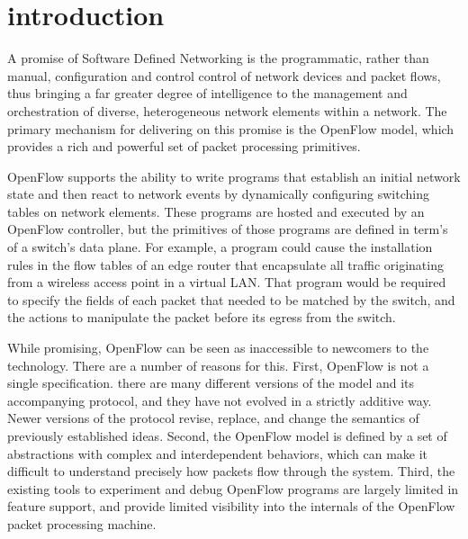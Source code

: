 
\section{introduction}
\label{sec:ref}

A promise of Software Defined Networking is the programmatic, rather
than manual, configuration and control control of network devices and packet 
flows, thus bringing a far greater degree of intelligence to the management and
orchestration of diverse, heterogeneous network elements within a
network. The primary mechanism for delivering on this promise is
the OpenFlow model, which provides a rich and powerful set of packet 
processing primitives.


OpenFlow supports the ability to write programs that establish an initial
network state and then react to network events by dynamically configuring 
switching tables on network elements. These programs are hosted and executed by 
an OpenFlow controller, but the primitives of those programs are
defined in term's of a switch's data plane. For example, a program
could cause the installation rules in the flow tables of an edge router
that encapsulate all traffic originating from a wireless access
point in a virtual LAN. That program would be required to specify
the fields of each packet that needed to be matched by the switch, and 
the actions to manipulate the packet before its egress from the
switch.

While promising, OpenFlow can be seen as inaccessible to newcomers to the 
technology. There are a number of reasons for this.
First, OpenFlow is not a single specification. there are many different
versions of the model and its accompanying protocol, and they have not
evolved in a strictly additive way. Newer versions of the protocol revise,
replace, and change the semantics of previously established ideas.
Second, the OpenFlow model is defined by a set of abstractions with
complex and interdependent behaviors, which can make it difficult to 
understand precisely how packets flow through the system.
Third, the existing tools to experiment and debug OpenFlow programs are 
largely limited in feature support, and provide limited visibility into the 
internals of the OpenFlow packet processing machine.

